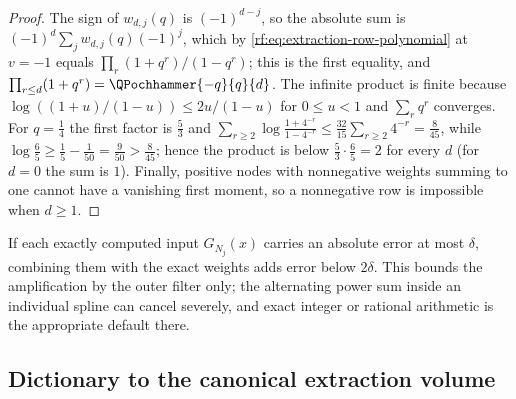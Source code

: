 \documentclass[11pt,oneside]{article}
\theoremstyle{plain}
\theoremstyle{definition}
\theoremstyle{remark}
\newcommand{\qp}[3]{\QPochhammer{#1}{#2}{#3}}
\begin{document}
\begin{proof}
The sign of $w_{d,j}(q)$ is $(-1)^{d-j}$, so the absolute sum is
$(-1)^{d}\sum_{j}w_{d,j}(q)(-1)^{j}$, which by
\cref{rf:eq:extraction-row-polynomial} at $v=-1$ equals
$\prod_{r}(1+q^{r})/(1-q^{r})$; this is the first equality, and
$\prod_{r\le d}(1+q^{r})=\qp{-q}{q}{d}$.  The infinite product is finite
because $\log((1+u)/(1-u))\le2u/(1-u)$ for $0\le u<1$ and $\sum_{r}q^{r}$
converges.  For $q=\tfrac14$ the first factor is $\tfrac53$ and
$\sum_{r\ge2}\log\frac{1+4^{-r}}{1-4^{-r}}\le\frac{32}{15}\sum_{r\ge2}4^{-r}=\frac{8}{45}$,
while $\log\frac65\ge\frac15-\frac1{50}=\frac{9}{50}>\frac{8}{45}$; hence the
product is below $\tfrac53\cdot\tfrac65=2$ for every $d$ (for $d=0$ the sum
is $1$).  Finally, positive nodes with nonnegative weights summing to one
cannot have a vanishing first moment, so a nonnegative row is impossible
when $d\ge1$.
\end{proof}

If each exactly computed input $G_{N_{j}}(x)$ carries an absolute error at
most $\delta$, combining them with the exact weights adds error below
$2\delta$.  This bounds the amplification by the outer filter only; the
alternating power sum inside an individual spline can cancel severely, and
exact integer or rational arithmetic is the appropriate default there.

\subsection{Dictionary to the canonical extraction volume}
\label{rf:sec:extraction-volume}
\end{document}
